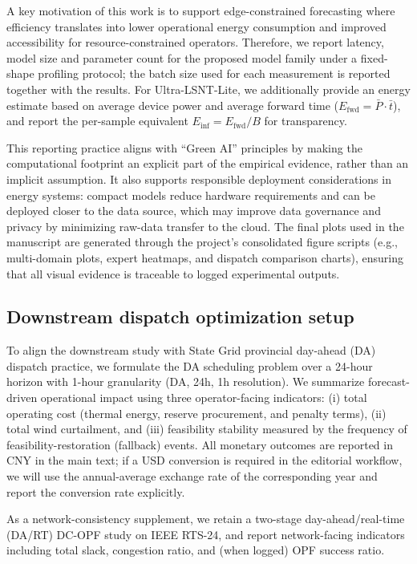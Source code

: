\documentclass[review,3p,times]{elsarticle}
\begin{document}
A key motivation of this work is to support edge-constrained forecasting where efficiency translates into lower operational energy consumption and improved accessibility for resource-constrained operators. Therefore, we report latency, model size and parameter count for the proposed model family under a fixed-shape profiling protocol; the batch size used for each measurement is reported together with the results. For Ultra-LSNT-Lite, we additionally provide an energy estimate based on average device power and average forward time ($E_{\text{fwd}}=\bar{P}\cdot\bar{t}$), and report the per-sample equivalent $E_{\text{inf}}=E_{\text{fwd}}/B$ for transparency.

This reporting practice aligns with ``Green AI'' principles \cite{schwartz2020greenai,strubell2019energy} by making the computational footprint an explicit part of the empirical evidence, rather than an implicit assumption. It also supports responsible deployment considerations in energy systems: compact models reduce hardware requirements and can be deployed closer to the data source, which may improve data governance and privacy by minimizing raw-data transfer to the cloud. The final plots used in the manuscript are generated through the project's consolidated figure scripts (e.g., multi-domain plots, expert heatmaps, and dispatch comparison charts), ensuring that all visual evidence is traceable to logged experimental outputs.

\subsection{Downstream dispatch optimization setup}
\label{subsec:dispatch_setup}
To align the downstream study with State Grid provincial day-ahead (DA) dispatch practice, we formulate the DA scheduling problem over a 24-hour horizon with 1-hour granularity (DA, 24h, 1h resolution)\cite{dlt5002_2021}. We summarize forecast-driven operational impact using three operator-facing indicators: (i) total operating cost (thermal energy, reserve procurement, and penalty terms), (ii) total wind curtailment, and (iii) feasibility stability measured by the frequency of feasibility-restoration (fallback) events. All monetary outcomes are reported in CNY in the main text; if a USD conversion is required in the editorial workflow, we will use the annual-average exchange rate of the corresponding year and report the conversion rate explicitly.

As a network-consistency supplement, we retain a two-stage day-ahead/real-time (DA/RT) DC-OPF study on IEEE RTS-24, and report network-facing indicators including total slack, congestion ratio, and (when logged) OPF success ratio.
\end{document}
